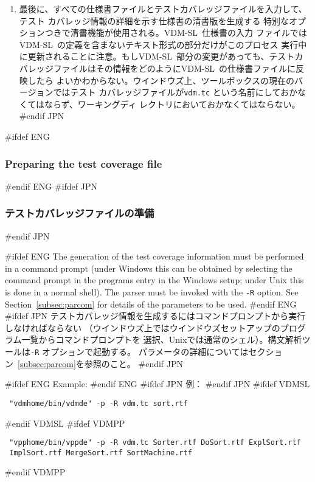 \documentclass[\pformat,12pt]{article}
\newcommand{\vdmslpp}{VDM-SL}
\newcommand{\vdmslpp}{VDM++}
\begin{document}
\begin{enumerate}
\item
  最後に、すべての仕様書ファイルとテストカバレッジファイルを入力して、テスト
  カバレッジ情報の詳細を示す仕様書の清書版を生成する
  特別なオプションつきで清書機能が使用される。\vdmslpp\ 仕様書の入力
  ファイルでは\vdmslpp\ の定義を含まないテキスト形式の部分だけがこのプロセス
  実行中に更新されることに注意。もし\vdmslpp\ 部分の変更があっても、テストカ
  バレッジファイルはその情報をどのように\vdmslpp\ の仕様書ファイルに反映したら
  よいかわからない。ウインドウズ上、ツールボックスの現在のバージョンではテスト
  カバレッジファイルが\texttt{vdm.tc} という名前にしておかなくてはならず、ワーキングディ
  レクトリにおいておかなくてはならない。
#endif JPN

\end{enumerate}


#ifdef ENG
\subsubsection{Preparing the test coverage file}
#endif ENG
#ifdef JPN
\subsubsection{テストカバレッジファイルの準備}
#endif JPN

#ifdef ENG
The generation of the test coverage information must be performed in a
command prompt (under Windows this can be obtained by selecting the
command prompt in the programs entry in the Windows setup; under
Unix this is done in a normal shell). The parser must be invoked with
 the {\tt -R} option. See
Section~\ref{subsec:parcom} for details of the parameters to be used.
#endif ENG
#ifdef JPN
テストカバレッジ情報を生成するにはコマンドプロンプトから実行しなければならない
（ウインドウズ上ではウインドウズセットアップのプログラム一覧からコマンドプロンプトを
選択、Unixでは通常のシェル）。構文解析ツールは{\tt -R} オプションで起動する。
パラメータの詳細についてはセクション~\ref{subsec:parcom}を参照のこと。
#endif JPN

#ifdef ENG
Example:
#endif ENG
#ifdef JPN
例：
#endif JPN
#ifdef VDMSL
\begin{verbatim}
 "vdmhome/bin/vdmde" -p -R vdm.tc sort.rtf
\end{verbatim}
#endif VDMSL
#ifdef VDMPP
\begin{verbatim}
 "vpphome/bin/vppde" -p -R vdm.tc Sorter.rtf DoSort.rtf ExplSort.rtf
 ImplSort.rtf MergeSort.rtf SortMachine.rtf
\end{verbatim}
#endif VDMPP
\end{document}
